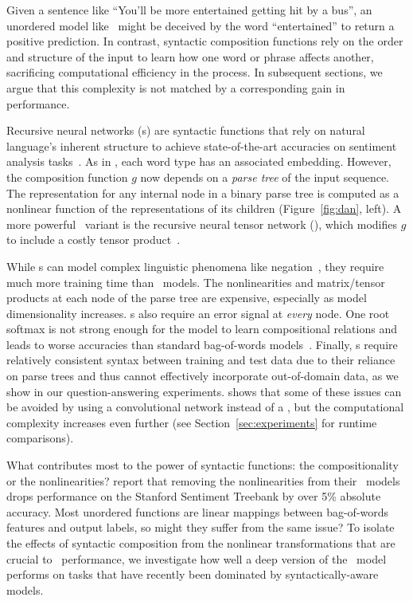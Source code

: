 Given a sentence like ``You'll be more entertained getting
hit by a bus'', an unordered model like \nbow\ might be deceived by the word ``entertained''
to return a positive prediction.  In contrast, syntactic composition functions
rely on the order and structure of the input to learn how one word or phrase
affects another, sacrificing computational efficiency in the process. In subsequent sections, we argue that this complexity is not matched by a corresponding gain in
performance.





Recursive neural networks (\recnn s) are syntactic functions that rely on natural language's inherent structure to achieve state-of-the-art accuracies on sentiment analysis tasks~\cite{taiacl15}. As in \nbow{}, each word type has an associated embedding. However, the composition function $g$ now depends on a \emph{parse tree} of the input sequence. The representation for any internal node in a binary parse tree is computed as a nonlinear function of the representations of its children (Figure~\ref{fig:dan}, left). A more powerful \recnn\ variant is the recursive neural tensor network (\rntn), which modifies $g$ to include a costly tensor product~\cite{socher2013recursive}.
















While \recnn s can model complex linguistic phenomena like
negation~\cite{Hermann:2013:CVSC}, they require much more training time than
\nbow\ models.  The nonlinearities and matrix/tensor products at each node of
the parse tree are expensive, especially as model dimensionality
increases. \recnn s also require an error signal at \emph{every} node.  One root
softmax is not strong enough for the model to learn compositional relations and leads to worse accuracies than standard bag-of-words models~\cite{jiweirnn}.
Finally, \recnn s require relatively consistent syntax between
training and test data due to their reliance on parse trees and thus cannot
effectively incorporate out-of-domain data, as we show in our question-answering
experiments.  shows that some of these issues can be avoided by using a convolutional network instead of a \recnn, but the computational complexity increases even further (see Section~\ref{sec:experiments} for runtime comparisons).

What contributes most to the power of syntactic functions: the compositionality
or the nonlinearities?  report that
removing the nonlinearities from their \recnn\ models drops performance on the
Stanford Sentiment Treebank by over 5\% absolute accuracy. Most unordered functions are linear
mappings between bag-of-words features and output labels, so might they suffer
from the same issue? To isolate the effects of syntactic composition from the
nonlinear transformations that are crucial to \recnn\ performance, we
investigate how well a deep version of the \nbow\ model performs on tasks that
have recently been dominated by syntactically-aware models.
